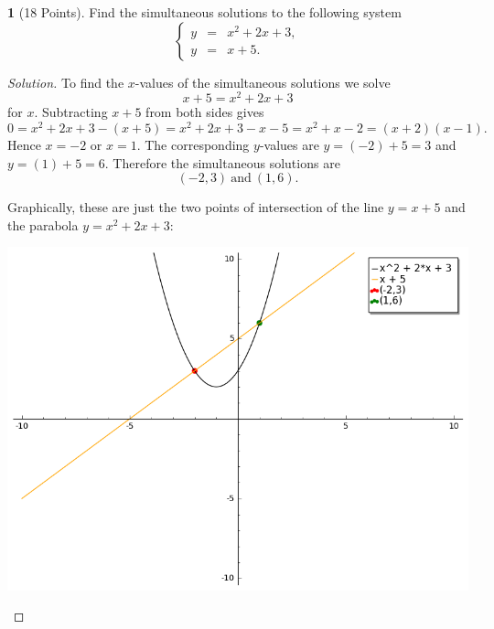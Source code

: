 \documentclass[12pt]{amsart}
\theoremstyle{definition}
\newtheorem{thm}{}
\theoremstyle{definition}
\begin{document}
\begin{thm}[18 Points]\label{ex9}
  Find the simultaneous solutions to the following system
  $$\left\{\begin{array}{rcl}
    y &=& x^2 + 2x + 3,\\
    y &=& x + 5.
  \end{array}\right.$$

  \begin{proof}[Solution]
    To find the $x$-values of the simultaneous solutions we solve
    $$x + 5 = x^2 + 2x + 3$$
    for $x$.
    Subtracting $x + 5$ from both sides gives 
    $$0 = x^2 + 2x + 3 - (x + 5) = x^2 + 2x + 3 - x - 5 = x^2 + x - 2 = (x + 2)(x - 1).$$
    Hence $x = -2$ or $x = 1$.
    The corresponding $y$-values are $y = (-2) + 5 = 3$ and $y = (1) + 5 = 6$.
    Therefore the simultaneous solutions are
    $$(-2, 3)\ \text{and}\ (1,6).$$
    
    Graphically, these are just the two points of intersection of the line $y = x + 5$ and the parabola $y = x^2 + 2x + 3$:
    \begin{center}
      \includegraphics[scale=0.5]{imgs/Intersection.png}
    \end{center}
  \end{proof}
\end{thm}
\end{document}
